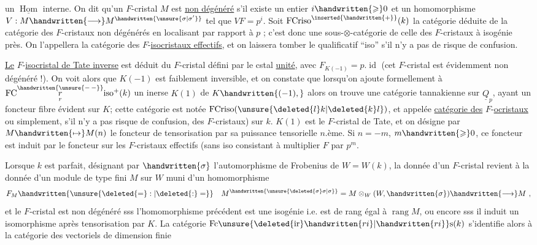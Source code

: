 un $\underline{\operatorname{Hom}}$ interne. On dit qu'un $F$-cristal $M$ est \uline{non dégénéré} s'il existe un entier $i\handwritten{\geqslant}0$ et un homomorphisme $V:M\handwritten{\longrightarrow}M^{\handwritten{\unsure{\sigma|\sigma'}}}$ tel que $VF=p^i$. Soit $\operatorname{FCriso}^{\inserted{\handwritten{+}}}(k)$ la catégorie  déduite de la catégorie des  $F$-cristaux non dégénérés en localisant par rapport à $p$ ; c'est donc une sous-$\otimes$-catégorie de celle des $F$-cristaux à isogénie près. On l'appellera la catégorie des $F$-\uline{isocristaux effectifs}, et on laissera tomber le qualificatif ``iso'' s'il n'y a pas de risque de confusion.

\uline{Le} $F$-\uline{isocristal de Tate inverse} est déduit du $F$\handwritten{\unsure{(}}-cristal défini par le cstal \uline{unité}, avec $F_{K(-1)}=p.\operatorname{id}$ (cet $F$-cristal est évidemment non dégénéré !). On voit alors que $K(-1)$ est faiblement inversible, et on constate que lorsqu'on ajoute formellement à $\mathrm{FC}\overset{\handwritten{\unsure{-\,-}}}{\underset{r}{r}}\mathrm{iso}^{+}(k)$  un inerse $K(1)$ de $K\handwritten{(-1),}$ alors on trouve une catégorie tannakienne sur $\underline{Q}_p$, ayant un foncteur fibre évident sur $K$; cette catégorie est notée $\operatorname{FCriso}(\unsure{\deleted{l}k|\deleted{k}l})$, et appelée \uline{catégorie des} $F$-\uline{ocristaux} \handwritten{(}ou simplement, s'il n'y  a pas risque de confusion, des $F$-cristaux) sur $k$. $K(1)$ est le $F$\handwritten{\unsure{(}}-cristal de Tate, et on désigne par $M\handwritten{\mapsto}M(n)$ le foncteur de tensorisation par sa puissance tensorielle $n$.ème. Si $n=-m$, $m\handwritten{\geqslant}0$, ce foncteur est induit par le foncteur sur les $F$-cristaux effectifs (sans iso\unsure{)} consistant à multiplier $F$ par $p^m$.

 Lorsque $k$ est parfait, désignant par $\handwritten{\sigma}$ l'automorphisme de Frobenius de $W=W(k)$, la donnée d'un $F$-cristal revient à la donnée d'un module de type fini $M$ sur $W$ muni d'un homomorphisme
\[
F_M\handwritten{\unsure{\deleted{=}:|\deleted{:}=}}\quad M^{\handwritten{\unsure{\deleted{\sigma}\sigma|\sigma}}}=M\otimes_W(W,\handwritten{\sigma})\handwritten{\longrightarrow}M\ ,
\]
et le $F$\handwritten{\unsure{(}}-cristal est non dégénéré sss l'homomorphisme précédent est une isogénie i.e. est de rang égal à $\operatorname{rang}M$, ou encore sss il induit un isomorphisme après tensorisation par $K$. La catégorie  $\mathrm{Fc}\unsure{\deleted{\mathrm{ir}}\handwritten{ri}|\handwritten{ri}}\mathrm{s}(k)$ s'identifie alors à la catégorie des vectoriels de dimension finie
